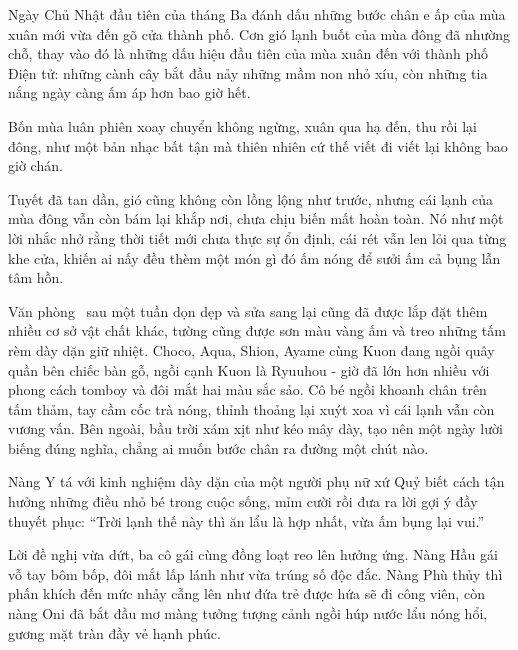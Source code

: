 \documentclass[../main.tex]{subfiles}
\begin{document}

Ngày Chủ Nhật đầu tiên của tháng Ba đánh dấu những bước chân e ấp của mùa xuân mới vừa đến gõ cửa thành phố. Cơn gió lạnh buốt của mùa đông đã nhường chỗ, thay vào đó là những dấu hiệu đầu tiên của mùa xuân đến với thành phố Điện tử: những cành cây bắt đầu nảy những mầm non nhỏ xíu, còn những tia nắng ngày càng ấm áp hơn bao giờ hết.

Bốn mùa luân phiên xoay chuyển không ngừng, xuân qua hạ đến, thu rồi lại đông, như một bản nhạc bất tận mà thiên nhiên cứ thế viết đi viết lại không bao giờ chán.

Tuyết đã tan dần, gió cũng không còn lồng lộng như trước, nhưng cái lạnh của mùa đông vẫn còn bám lại khắp nơi, chưa chịu biến mất hoàn toàn. Nó như một lời nhắc nhở rằng thời tiết mới chưa thực sự ổn định, cái rét vẫn len lỏi qua từng khe cửa, khiến ai nấy đều thèm một món gì đó ấm nóng để sưởi ấm cả bụng lẫn tâm hồn.

Văn phòng \hll\ sau một tuần dọn dẹp và sửa sang lại cũng đã được lắp đặt thêm nhiều cơ sở vật chất khác, tường cũng được sơn màu vàng ấm và treo những tấm rèm dày dặn giữ nhiệt. Choco, Aqua, Shion, Ayame cùng Kuon đang ngồi quây quần bên chiếc bàn gỗ, ngồi cạnh Kuon là Ryuuhou - giờ đã lớn hơn nhiều với phong cách tomboy và đôi mắt hai màu sắc sảo. Cô bé ngồi khoanh chân trên tấm thảm, tay cầm cốc trà nóng, thỉnh thoảng lại xuýt xoa vì cái lạnh vẫn còn vương vấn. Bên ngoài, bầu trời xám xịt như kéo mây dày, tạo nên một ngày lười biếng đúng nghĩa, chẳng ai muốn bước chân ra đường một chút nào.

Nàng Y tá với kinh nghiệm dày dặn của một người phụ nữ xứ Quỷ biết cách tận hưởng những điều nhỏ bé trong cuộc sống, mỉm cười rồi đưa ra lời gợi ý đầy thuyết phục: ``Trời lạnh thế này thì ăn lẩu là hợp nhất, vừa ấm bụng lại vui.''

Lời đề nghị vừa dứt, ba cô gái cùng đồng loạt reo lên hưởng ứng. Nàng Hầu gái vỗ tay bôm bốp, đôi mắt lấp lánh như vừa trúng số độc đắc. Nàng Phù thủy thì phấn khích đến mức nhảy cẫng lên như đứa trẻ được hứa sẽ đi công viên, còn nàng Oni đã bắt đầu mơ màng tưởng tượng cảnh ngồi húp nước lẩu nóng hổi, gương mặt tràn đầy vẻ hạnh phúc.
\end{document}
